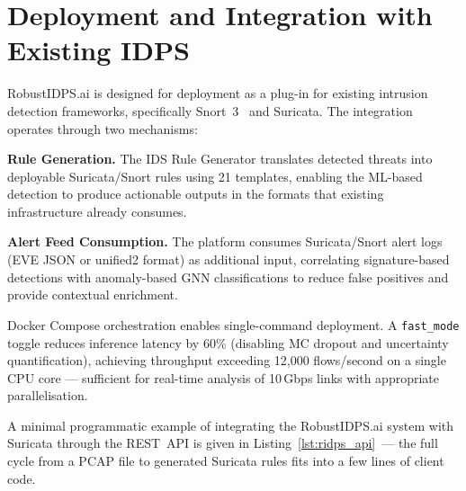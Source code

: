 \section{Deployment and Integration with Existing IDPS}
\label{sec:deployment}

RobustIDPS.ai is designed for deployment as a plug-in for existing intrusion detection frameworks, specifically Snort~3~\cite{Roesch1999} and Suricata. The integration operates through two mechanisms:

\noindent\textbf{Rule Generation.} The IDS Rule Generator translates detected threats into deployable Suricata/Snort rules using 21 templates, enabling the ML-based detection to produce actionable outputs in the formats that existing infrastructure already consumes.

\noindent\textbf{Alert Feed Consumption.} The platform consumes Suricata/Snort alert logs (EVE JSON or unified2 format) as additional input, correlating signature-based detections with anomaly-based GNN classifications to reduce false positives and provide contextual enrichment.

Docker Compose orchestration enables single-command deployment. A \texttt{fast\_mode} toggle reduces inference latency by 60\% (disabling MC dropout and uncertainty quantification), achieving throughput exceeding 12,000 flows/second on a single CPU core --- sufficient for real-time analysis of 10\,Gbps links with appropriate parallelisation.

A minimal programmatic example of integrating the
\textsf{RobustIDPS.ai} system with Suricata through the REST~API is
given in Listing~\ref{lst:ridps_api}~--- the full cycle from a PCAP
file to generated Suricata rules fits into a few lines of client
code.

